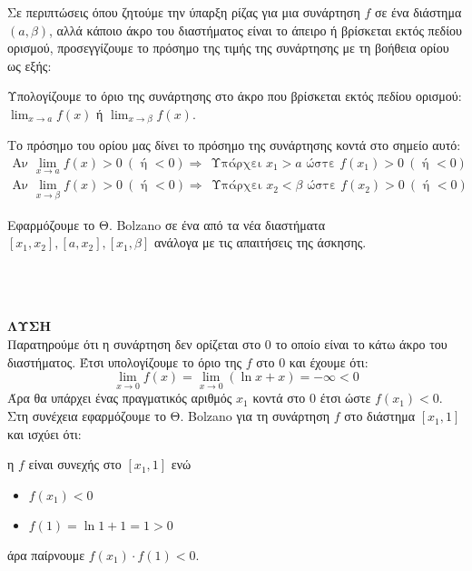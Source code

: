 \documentclass[twoside,nofonts,ektypwsh]{frontisthrio}
\begin{document}
\begin{Methodos}{5cm}
Σε περιπτώσεις όπου ζητούμε την ύπαρξη ρίζας για μια συνάρτηση $ f $ σε ένα διάστημα $ (a,\beta) $, αλλά κάποιο άκρο του διαστήματος είναι το άπειρο ή βρίσκεται εκτός πεδίου ορισμού, προσεγγίζουμε το πρόσημο της τιμής της συνάρτησης με τη βοήθεια ορίου ως εξής:
\begin{bhma}
\item Υπολογίζουμε το όριο της συνάρτησης στο άκρο που βρίσκεται εκτός πεδίου ορισμού: $ \lim_{x\to a}{f(x)} $ ή $ \lim_{x\to \beta}{f(x)} $.
\item Το πρόσημο του ορίου μας δίνει το πρόσημο της συνάρτησης κοντά στο σημείο αυτό:
\begin{gather*}
\textrm{Αν }\lim_{x\to a}{f(x)}> 0\ (\textrm{ ή }< 0)\Rightarrow\ \ \textrm{Υπάρχει }x_1>a\textrm{ ώστε } f(x_1)>0\ (\textrm{ ή }<0)\\
\textrm{Αν }\lim_{x\to\beta}{f(x)}> 0\ (\textrm{ ή }< 0)\Rightarrow\ \ \textrm{Υπάρχει }x_2<\beta\textrm{ ώστε } f(x_2)>0\ (\textrm{ ή }<0)
\end{gather*}
\item Εφαρμόζουμε το Θ. Bolzano σε ένα από τα νέα διαστήματα $ [x_1,x_2],[a,x_2],[x_1,\beta] $ ανάλογα με τις απαιτήσεις της άσκησης.
\end{bhma}
\end{Methodos}\mbox{}\\
\\\\
\textbf{ΛΥΣΗ}\\
Παρατηρούμε ότι η συνάρτηση δεν ορίζεται στο $ 0 $ το οποίο είναι το κάτω άκρο του διαστήματος. Έτσι υπολογίζουμε το όριο της $ f $ στο $ 0 $ και έχουμε ότι:
\[ \lim_{x\to 0}{f(x)}=\lim_{x\to 0}{(\ln{x}+x)}=-\infty<0 \]
Άρα θα υπάρχει ένας πραγματικός αριθμός $ x_1 $ κοντά στο $ 0 $ έτσι ώστε $ f(x_1)<0 $. Στη συνέχεια εφαρμόζουμε το Θ. Bolzano για τη συνάρτηση $ f $ στο διάστημα $ [x_1,1] $ και ισχύει ότι:
\begin{rlist}
\item η $ f $ είναι συνεχής στο $ [x_1,1] $ ενώ
\item \begin{itemize}
\item $ f(x_1)<0 $
\item $ f(1)=\ln1+1=1>0 $
\end{itemize}
άρα παίρνουμε $ f(x_1)\cdot f(1)<0 $.
\end{rlist}
\end{document}

